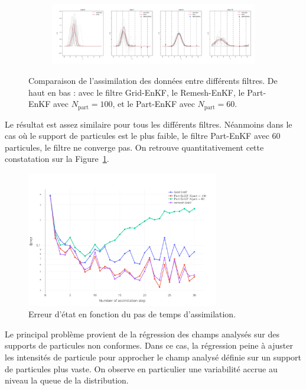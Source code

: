 \begin{figure}
\begin{subfigure}{\textwidth}
    \end{subfigure}
    \begin{subfigure}{\textwidth}
        \includegraphics[width=\textwidth]{images/app1d/wo_calibration/part_enkf_60.png}
    \end{subfigure}
    \caption{Comparaison de l'assimilation des données entre différents filtres. De haut en bas : avec le filtre Grid-EnKF, le Remesh-EnKF, le Part-EnKF avec \(N_{\text{part}}=100\), et le Part-EnKF avec \(N_{\text{part}}=60\).}
\end{figure}
Le résultat est assez similaire pour tous les différents filtres. Néanmoins dans le cas où le support de particules est le plus faible, le filtre Part-EnKF avec 60 particules, le filtre ne converge pas. On retrouve quantitativement cette constatation sur la Figure~\ref{fig:1d_error_time}.

\begin{figure}
    \centering
    \includegraphics[width=0.75\textwidth]{images/app1d/wo_calibration/state_error.png}
    \caption{Erreur d'état en fonction du pas de temps d'assimilation.}
    \label{fig:1d_error_time}
\end{figure}

Le principal problème provient de la régression des champs analysés sur des supports de particules non conformes. Dans ce cas, la régression peine à ajuster les intensités de particule pour approcher le champ analysé définie sur un support de particules plus vaste. On observe en particulier une variabilité accrue au niveau la queue de la distribution.

